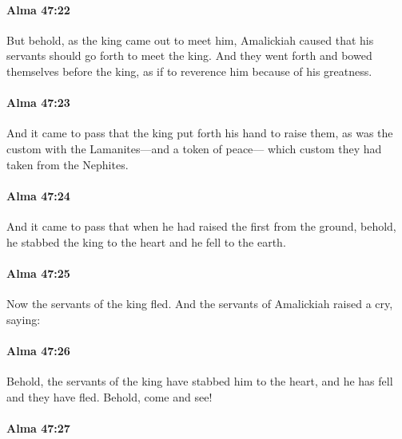 		\paragraph{Alma 47:22} %
			\label{ALMA-47-22}

			But behold, as the king came out to meet him,
			Amalickiah caused that his servants should go forth to meet the king.
			And they went forth and bowed themselves before the king,
			as if to reverence him because of his greatness.

		\paragraph{Alma 47:23} %
			\label{ALMA-47-23}

			And it came to pass that the king put forth his hand to raise them,
			as was the custom with the Lamanites---and a token of peace---
			which custom they had taken from the Nephites.

		\paragraph{Alma 47:24} %
			\label{ALMA-47-24}

			And it came to pass that when he had raised the first from the ground,
			behold, he stabbed the king to the heart and he fell to the earth.

		\paragraph{Alma 47:25} %
			\label{ALMA-47-25}

			Now the servants of the king fled.
			And the servants of Amalickiah raised a cry, saying:

		\paragraph{Alma 47:26} %
			\label{ALMA-47-26}

			Behold, the servants of the king have stabbed him to the heart,
			and he has fell and they have fled.
			Behold, come and see!

		\paragraph{Alma 47:27} %
			\label{ALMA-47-27}

